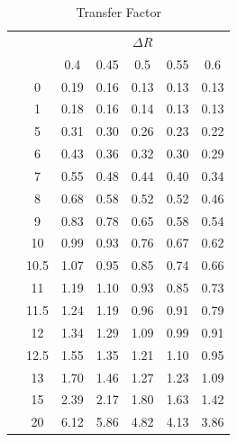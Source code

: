 \begin{table}[!htb]
	\centering
	\label{tab:iso-scan-transfer-factor}
		\caption{Transfer Factor}
			\begin{tabular}{cc|ccccc}
    			&\multicolumn{1}{c}{} & \multicolumn{5}{c}{$\Delta R$} \\
    && 0.4 & 0.45 & 0.5 & 0.55 & 0.6 \\
    \cline{2-7}
& 0 & 0.19 & 0.16 & 0.13 & 0.13 & 0.13 \\ 
& 1 & 0.18 & 0.16 & 0.14 & 0.13 & 0.13 \\ 
& 5 & 0.31 & 0.30 & 0.26 & 0.23 & 0.22 \\ 
& 6 & 0.43 & 0.36 & 0.32 & 0.30 & 0.29 \\ 
& 7 & 0.55 & 0.48 & 0.44 & 0.40 & 0.34 \\ 
& 8 & 0.68 & 0.58 & 0.52 & 0.52 & 0.46 \\ 
\smash{\rotatebox[origin=c]{90}{\pt}} & 9 & 0.83 & 0.78 & 0.65 & 0.58 & 0.54 \\ 
& 10 & 0.99 & 0.93 & 0.76 & 0.67 & 0.62 \\ 
& 10.5 & 1.07 & 0.95 & 0.85 & 0.74 & 0.66 \\ 
& 11 & 1.19 & 1.10 & 0.93 & 0.85 & 0.73 \\ 
& 11.5 & 1.24 & 1.19 & 0.96 & 0.91 & 0.79 \\ 
& 12 & 1.34 & 1.29 & 1.09 & 0.99 & 0.91 \\ 
& 12.5 & 1.55 & 1.35 & 1.21 & 1.10 & 0.95 \\ 
& 13 & 1.70 & 1.46 & 1.27 & 1.23 & 1.09 \\ 
& 15 & 2.39 & 2.17 & 1.80 & 1.63 & 1.42 \\ 
& 20 & 6.12 & 5.86 & 4.82 & 4.13 & 3.86 \\ 
  \end{tabular}
\end{table}

